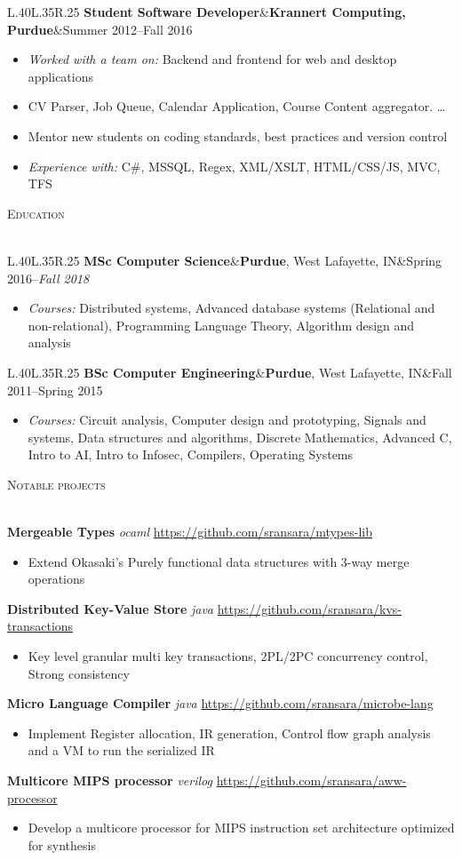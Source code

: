 \documentclass[a4paper]{article}
\newcommand{\header} [1] {
    {\hspace*{-18pt}\vspace*{6pt} \textsc{#1}
    \vspace*{-14pt} \\ \hspace*{-18pt} \hrulefill{} \\
    \vspace{1mm}}
}
\newcommand{\threeparts} [3] {
    {\setlength\tabcolsep{0pt}
    \begin{tabularx}{\linewidth}{L{.40\linewidth}L{.35\linewidth}R{.25\linewidth}} 
    \textbf{#1}&#2&#3
    \end{tabularx}}
}
\begin{document}
\threeparts{Student Software Developer}{\textbf{Krannert Computing, Purdue}}{Summer 2012--Fall 2016}
\begin{itemize}[label=$\square$]
    \item \textit{Worked with a team on:} Backend and frontend for web and desktop applications
    \item CV Parser, Job Queue, Calendar Application, Course Content aggregator. \dots
    \item Mentor new students on coding standards, best practices and version control
    \item \textit{Experience with:} C\#, MSSQL, Regex, XML/XSLT, HTML/CSS/JS, MVC, TFS
\end{itemize}

\header{Education}
\threeparts{MSc Computer Science}{\textbf{Purdue}, West Lafayette, IN}{Spring 2016--\textit{Fall 2018}}
\begin{itemize}[label=$\square$]
	\item \textit{Courses:} Distributed systems, Advanced database systems (Relational and non-relational), Programming Language Theory, Algorithm design and analysis
\end{itemize}
\threeparts{BSc Computer Engineering}{\textbf{Purdue}, West Lafayette, IN}{Fall 2011--Spring 2015}
\begin{itemize}[label=$\square$]
	\item \textit{Courses:} Circuit analysis, Computer design and prototyping, Signals and systems, Data structures and algorithms, Discrete Mathematics, Advanced C, Intro to AI, Intro to Infosec, Compilers, Operating Systems
\end{itemize}


\header{Notable projects}
{\textbf{Mergeable Types}} {\sl ocaml\/} \hfill \url{https://github.com/sransara/mtypes-lib}
\begin{itemize}[label=$\square$]
	\item Extend Okasaki's Purely functional data structures with 3-way merge operations
\end{itemize}
{\textbf{Distributed Key-Value Store}} {\sl java\/} \hfill \url{https://github.com/sransara/kvs-transactions}
\begin{itemize}[label=$\square$]
	\item Key level granular multi key transactions, 2PL/2PC concurrency control, Strong consistency
\end{itemize}
{\textbf{Micro Language Compiler}} {\sl java\/} \hfill \url{https://github.com/sransara/microbe-lang}
\begin{itemize}[label=$\square$]
	\item Implement Register allocation, IR generation, Control flow graph analysis and a VM to run the serialized IR
\end{itemize}
{\textbf{Multicore MIPS processor}} {\sl verilog\/} \hfill \url{https://github.com/sransara/aww-processor}
\begin{itemize}[label=$\square$]
    \item Develop a multicore processor for MIPS instruction set architecture optimized for synthesis
\end{itemize}
\end{document}

